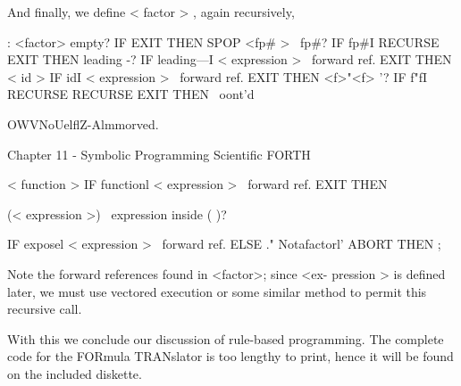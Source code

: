 And finally, we define < factor > , again recursively,

: <factor> empty? IF EXIT THEN \done
SPOP <fp# > \ fp#?
IF fp#I RECURSE EXIT THEN
leading -?
IF leading—I < expression > \ forward ref.
EXIT THEN
< id > IF idI < expression > \ forward ref.
EXIT THEN
<f>"<f> \exponent’?
IF f"fI RECURSE RECURSE
EXIT THEN
\ oont'd

OWVNoUelﬂZ-Almmorved.

Chapter 11 - Symbolic Programming Scientiﬁc FORTH

< function >
IF functionl < expression > \ forward ref.
EXIT THEN

(< expression >) \ expression inside ( )?

IF exposel < expression > \ forward ref.
ELSE ." Notafactorl' ABORT THEN ;

Note the forward references found in <factor>; since <ex-
pression > is deﬁned later, we must use vectored execution or
some similar method to permit this recursive call.

With this we conclude our discussion of rule-based programming.
The complete code for the FORmula TRANslator is too lengthy
to print, hence it will be found on the included diskette.